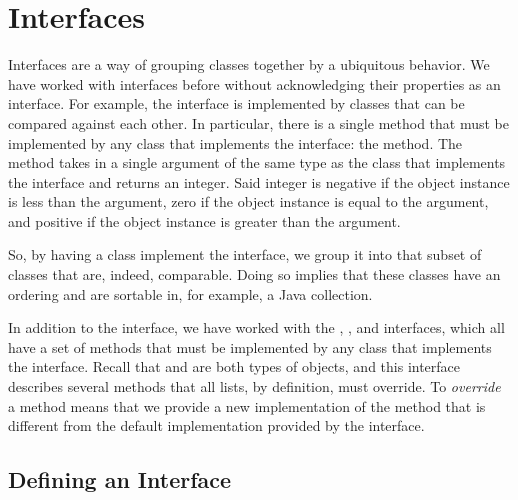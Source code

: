 \section{Interfaces}

Interfaces are a way of grouping classes together by a ubiquitous behavior. We have worked with interfaces before without acknowledging their properties as an interface. For example, the  interface is implemented by classes that can be compared against each other. In particular, there is a single method that must be implemented by any class that implements the  interface: the  method. The  method takes in a single argument of the same type as the class that implements the  interface and returns an integer. Said integer is negative if the object instance is less than the argument, zero if the object instance is equal to the argument, and positive if the object instance is greater than the argument.

So, by having a class implement the  interface, we group it into that subset of classes that are, indeed, comparable. Doing so implies that these classes have an ordering and are sortable in, for example, a Java collection. 

In addition to the  interface, we have worked with the , , and  interfaces, which all have a set of methods that must be implemented by any class that implements the interface. Recall that  and  are both types of  objects, and this interface describes several methods that all lists, by definition, must override. To \emph{override} a method means that we provide a new implementation of the method that is different from the default implementation provided by the interface.

\subsection{Defining an Interface}


